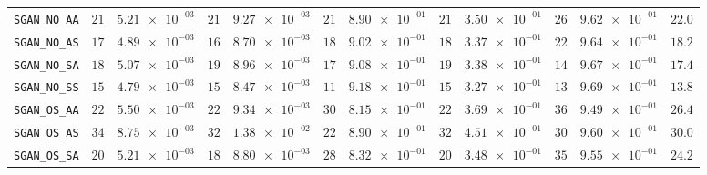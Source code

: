 \begin{xltabular}{\textwidth}{l||cC|cC|cC|cC|cC||c}
	\texttt{SGAN\_NO\_AA} & $ 21$ & $ \num{5.21e-03}$ & $ 21$ & $ \num{9.27e-03}$ & $ 21$ & $ \num{8.90e-01}$ & $ 21$ & $ \num{3.50e-01}$ & $ 26$ & $ \num{9.62e-01}$ & $ 22.0$  \\
	\texttt{SGAN\_NO\_AS} & $ 17$ & $ \num{4.89e-03}$ & $ 16$ & $ \num{8.70e-03}$ & $ 18$ & $ \num{9.02e-01}$ & $ 18$ & $ \num{3.37e-01}$ & $ 22$ & $ \num{9.64e-01}$ & $ 18.2$  \\
	\texttt{SGAN\_NO\_SA} & $ 18$ & $ \num{5.07e-03}$ & $ 19$ & $ \num{8.96e-03}$ & $ 17$ & $ \num{9.08e-01}$ & $ 19$ & $ \num{3.38e-01}$ & $ 14$ & $ \num{9.67e-01}$ & $ 17.4$  \\
	\texttt{SGAN\_NO\_SS} & $ 15$ & $ \num{4.79e-03}$ & $ 15$ & $ \num{8.47e-03}$ & $ 11$ & $ \num{9.18e-01}$ & $ 15$ & $ \num{3.27e-01}$ & $ 13$ & $ \num{9.69e-01}$ & $ 13.8$  \\
	\texttt{SGAN\_OS\_AA} & $ 22$ & $ \num{5.50e-03}$ & $ 22$ & $ \num{9.34e-03}$ & $ 30$ & $ \num{8.15e-01}$ & $ 22$ & $ \num{3.69e-01}$ & $ 36$ & $ \num{9.49e-01}$ & $ 26.4$  \\
	\texttt{SGAN\_OS\_AS} & $ 34$ & $ \num{8.75e-03}$ & $ 32$ & $ \num{1.38e-02}$ & $ 22$ & $ \num{8.90e-01}$ & $ 32$ & $ \num{4.51e-01}$ & $ 30$ & $ \num{9.60e-01}$ & $ 30.0$  \\
	\texttt{SGAN\_OS\_SA} & $ 20$ & $ \num{5.21e-03}$ & $ 18$ & $ \num{8.80e-03}$ & $ 28$ & $ \num{8.32e-01}$ & $ 20$ & $ \num{3.48e-01}$ & $ 35$ & $ \num{9.55e-01}$ & $ 24.2$  \\

\end{xltabular}
